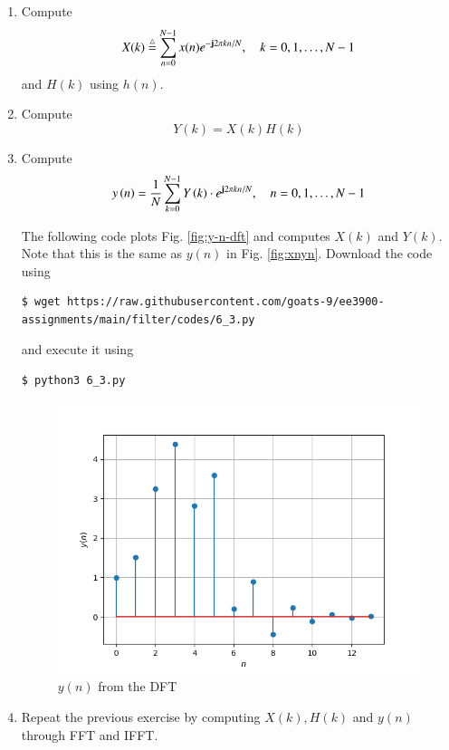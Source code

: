 \documentclass[journal,12pt,twocolumn]{IEEEtran}
\renewcommand\thesection{\arabic{section}}
\begin{document}
\begin{enumerate}[label=\thesection.\arabic*]
\item
Compute
\begin{equation}
X(k) \stackrel{\triangle}{=} \sum _{n=0}^{N-1}x(n) e^{-\mathbf{j}2\pi kn/N}, \quad k = 0,1,\dots, N-1
\end{equation}
and $H(k)$ using $h(n)$.
\item Compute 
\begin{equation}
Y(k) = X(k)H(k)
\label{eq:fp}
\end{equation}
\item Compute
\begin{equation}
y\left(n\right)={\frac {1}{N}}\sum _{k=0}^{N-1}Y\left(k\right)\cdot e^{\mathbf{j} 2\pi kn/N},\quad n = 0,1,\dots, N-1
\label{eq:inv-ft}
\end{equation}

\solution The following code plots Fig. \eqref{fig:y-n-dft} and computes $X(k)$
and $Y(k)$. Note that this is the same as $y(n)$ in Fig. \eqref{fig:xnyn}.
Download the code using
\begin{lstlisting}
$ wget https://raw.githubusercontent.com/goats-9/ee3900-assignments/main/filter/codes/6_3.py
\end{lstlisting}
and execute it using
\begin{lstlisting}
$ python3 6_3.py
\end{lstlisting}

\begin{figure}[!ht]
	\centering
	\includegraphics[width=\columnwidth]{Figures/Q6/6__3.png}
	\caption{$y(n)$ from the DFT}
	\label{fig:y-n-dft}
\end{figure}
\item Repeat the previous exercise by computing $X(k), H(k)$ and $y(n)$ through FFT and 
IFFT.


\end{enumerate}
\end{document}
